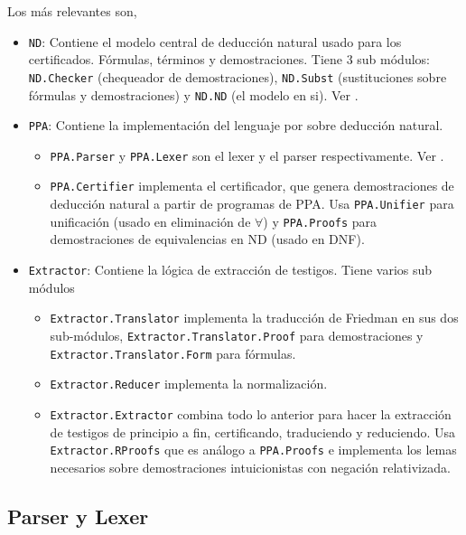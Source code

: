 Los más relevantes son,

\begin{itemize}
    \item \texttt{ND}: Contiene el modelo central de deducción natural usado para los
    certificados. Fórmulas, términos y demostraciones. Tiene 3 sub módulos:
    \texttt{ND.Checker} (chequeador de demostraciones), \texttt{ND.Subst}
    (sustituciones sobre fórmulas y demostraciones) y \texttt{ND.ND} (el modelo
    en si). Ver .
    \item \texttt{PPA}: Contiene la implementación del lenguaje \ppaLang{} por
    sobre deducción natural.
    \begin{itemize}
        \item \texttt{PPA.Parser} y \texttt{PPA.Lexer} son el lexer y el parser
        respectivamente. Ver .
        \item \texttt{PPA.Certifier} implementa el certificador, que genera
        demostraciones de deducción natural a partir de programas de PPA. Usa
        \texttt{PPA.Unifier} para unificación (usado en eliminación de $\forall$) y \texttt{PPA.Proofs} para
        demostraciones de equivalencias en ND (usado en DNF).
    \end{itemize}
    \item \texttt{Extractor}: Contiene la lógica de extracción de testigos.
    Tiene varios sub módulos
    \begin{itemize}
        \item \texttt{Extractor.Translator} implementa la traducción de Friedman
        en sus dos sub-módulos, \texttt{Extractor.Translator.Proof} para
        demostraciones y\\\texttt{Extractor.Translator.Form} para fórmulas.
        \item \texttt{Extractor.Reducer} implementa la normalización.
        \item \texttt{Extractor.Extractor} combina todo lo anterior para hacer
        la extracción de testigos de principio a fin, certificando, traduciendo
        y reduciendo. Usa \\\texttt{Extractor.RProofs} que es análogo a
        \texttt{PPA.Proofs} e implementa los lemas necesarios sobre
        demostraciones intuicionistas con negación relativizada.
    \end{itemize}
\end{itemize}


\subsection{Parser y Lexer}
\label{ppa-tool:sec:parser-lexer}

